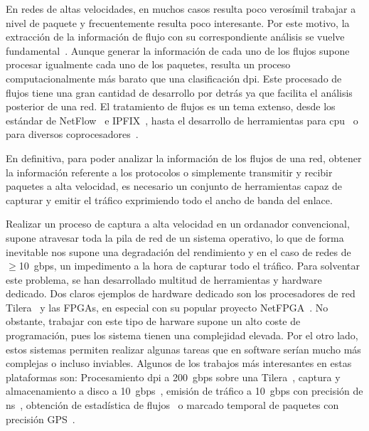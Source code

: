En redes de altas velocidades, en muchos casos resulta poco verosímil trabajar a nivel de paquete y frecuentemente resulta poco interesante. Por este motivo, la extracción de la información de flujo con su correspondiente análisis se vuelve fundamental~\cite{fp:pedroth}. Aunque generar la información de cada uno de los flujos supone procesar igualmente cada uno de los paquetes, resulta un proceso computacionalmente más barato que una clasificación \gls{dpi}. Este procesado de flujos tiene una gran cantidad de desarrollo por detrás ya que facilita el análisis posterior de una red. El tratamiento de flujos es un tema extenso, desde los estándar de NetFlow~\cite{claise2004cisco,rt:netflow} e IPFIX~\cite{hofstede14surveys,claise2008specification}, hasta el desarrollo de herramientas para \gls{cpu}~\cite{mckeown2008openflow,kimCOMCOM06,garcia2014low,fp:pedroth} o para diversos coprocesadores~\cite{fp:marco}.

En definitiva, para poder analizar la información de los flujos de una red, obtener la información referente a los protocolos o simplemente transmitir y recibir paquetes a alta velocidad, es necesario un conjunto de herramientas capaz de capturar y emitir el tráfico exprimiendo todo el ancho de banda del enlace.

\newpage
{}

Realizar un proceso de captura a alta velocidad en un ordanador convencional, supone atravesar toda la pila de red de un sistema operativo, lo que de forma inevitable nos supone una degradación del rendimiento y en el caso de redes de $\geq$10~\gls{gbps}, un impedimento a la hora de capturar todo el tráfico. Para solventar este problema, se han desarrollado multitud de herramientas y hardware dedicado. Dos claros ejemplos de hardware dedicado son los procesadores de red Tilera~\cite{bib:tilera} y las FPGAs, en especial con su popular proyecto NetFPGA~\cite{dpdk:netfpga}.
No obstante, trabajar con este tipo de harware supone un alto coste de programación, pues los sistema tienen una complejidad elevada. Por el otro lado, estos sistemas permiten realizar algunas tareas que en software serían mucho más complejas o incluso inviables. Algunos de los trabajos más interesantes en estas plataformas son: Procesamiento \gls{dpi} a 200~\gls{gbps} sobre una Tilera~\cite{bib:tilera:dpi200}, captura y almacenamiento a disco a 10~\gls{gbps}~\cite{zazo2014tnt10g}, emisión de tráfico a 10~\gls{gbps} con precisión de ns~\cite{zazo2014tnt10g}, obtención de estadística de flujos~\cite{fp:marco} o marcado temporal de paquetes con precisión GPS~\cite{garnica2010argos,kaemmerer2015method}.

